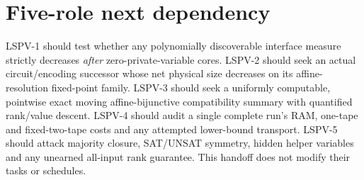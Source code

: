 \documentclass[11pt]{article}
\begin{document}
\section{Five-role next dependency}
LSPV-1 should test whether any polynomially discoverable interface measure strictly decreases \emph{after} zero-private-variable cores. LSPV-2 should seek an actual circuit/encoding successor whose net physical size decreases on its affine-resolution fixed-point family. LSPV-3 should seek a uniformly computable, pointwise exact moving affine-bijunctive compatibility summary with quantified rank/value descent. LSPV-4 should audit a single complete run's RAM, one-tape and fixed-two-tape costs and any attempted lower-bound transport. LSPV-5 should attack majority closure, SAT/UNSAT symmetry, hidden helper variables and any unearned all-input rank guarantee. This handoff does not modify their tasks or schedules.


\end{document}

